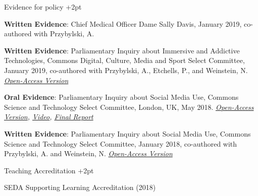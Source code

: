\documentclass{resume} %
\begin{document}
\begin{rSection}{Evidence for policy} \itemsep +2pt

\item \textbf{Written Evidence}: Chief Medical Officer Dame Sally Davis, January 2019, co-authored with Przybylski, A. 

\item \textbf{Written Evidence}: Parliamentary Inquiry about Immersive and Addictive Technologies, Commons Digital, Culture, Media and Sport Select Committee, January 2019, co-authored with Przybylski, A., Etchells, P., and Weinstein, N. \textit{{\href{http://data.parliament.uk/writtenevidence/committeeevidence.svc/evidencedocument/digital-culture-media-and-sport-committee/immersive-and-addictive-technologies/written/94916.pdf}{Open-Access Version}}}

\item \textbf{Oral Evidence}: Parliamentary Inquiry about Social Media Use, Commons Science and Technology Select Committee, London, UK, May 2018. \textit{{\href{http://data.parliament.uk/writtenevidence/committeeevidence.svc/evidencedocument/science-and-technology-committee/impact-of-social-media-and-screenuse-on-young-peoples-health/oral/83611.html}{Open-Access Version}}, {\href{https://parliamentlive.tv/event/index/5a5ab5c2-1c6e-4d31-a9c3-1c0589442f95}{Video}}, {\href{https://publications.parliament.uk/pa/cm201719/cmselect/cmsctech/822/822.pdf}{Final Report}}}

\item \textbf{Written Evidence}: Parliamentary Inquiry about Social Media Use, Commons Science and Technology Select Committee, January 2018, co-authored with Przybylski, A. and Weinstein, N. \textit{{\href{http://data.parliament.uk/writtenevidence/committeeevidence.svc/evidencedocument/science-and-technology-committee/social-media-and-mental-health/written/81228.pdf}{Open-Access Version}}}

\end{rSection}


\begin{rSection}{Teaching Accreditation} \itemsep +2pt

\item SEDA Supporting Learning Accreditation (2018)

\end{rSection}
\end{document}
